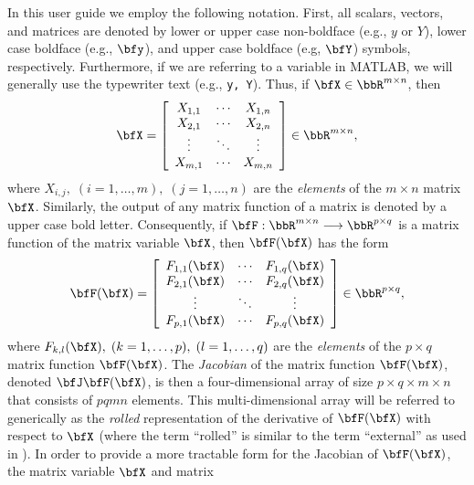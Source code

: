 \documentclass[10pt,pdftex]{article}
\begin{document}
In this user guide we employ the following notation.  First, all scalars, vectors, and matrices are denoted by lower or upper case non-boldface (e.g., $y$ or $Y$), lower case boldface (e.g., $\bfy$), and upper case boldface (e.g, $\bfY$) symbols, respectively. Furthermore, if we are referring to a variable in MATLAB, we will generally use the typewriter text (e.g., \texttt{y, Y}).
Thus, if $\bfX\in\bbR^{m\times n}$, then
\begin{equation}\label{general-matrix-x}
  \bfX =
  \left[\begin{array}{ccc}
      X_{1,1} & \cdots & X_{1,n} \\
      X_{2,1} & \cdots & X_{2,n} \\
      \vdots & \ddots & \vdots \\
      X_{m,1} & \cdots & X_{m,n}
    \end{array}
  \right]\in\bbR^{m\times n}, 
\end{equation}
where $X_{i,j},\;(i=1,\ldots,m),\;(j=1,\ldots,n)$ are the {\em elements} 
of the $m\times n$ matrix $\bfX$.  Similarly, the output of any
matrix function of a matrix is denoted by a upper case bold letter.  Consequently,
if $\bfF:\bbR^{m\times n}\longrightarrow \bbR^{p\times q}$ is a matrix
function of the matrix variable $\bfX$, then $\bfF(\bfX)$ has the form
\begin{equation}\label{general-matrix-f}
  \bfF(\bfX) =
  \left[
    \begin{array}{ccc}
      F_{1,1}(\bfX) & \cdots & F_{1,q}(\bfX) \\
      F_{2,1}(\bfX) & \cdots & F_{2,q}(\bfX) \\
      \vdots & \ddots & \vdots \\
      F_{p,1}(\bfX) & \cdots & F_{p,q}(\bfX)
    \end{array}
  \right]\in\bbR^{p\times q},
\end{equation}
where $F_{k,l}(\bfX),\;(k=1,\ldots,p),\;(l=1,\ldots,q)$ are the 
{\em elements} of the $p\times q$ matrix function $\bfF(\bfX)$.  
The {\em Jacobian} of the matrix function $\bfF(\bfX)$, denoted
$\bfJ\bfF(\bfX)$, is then a four-dimensional array of size $p\times
q\times m\times n$ that consists of $pqmn$ elements.  This
multi-dimensional array will be referred to generically as the 
{\em rolled} representation of the derivative of $\bfF(\bfX)$ with
respect to $\bfX$ (where the term ``rolled'' is similar to the term
``external'' as used in \cite{Forth1}).  In order to provide a more tractable form for
the Jacobian of $\bfF(\bfX)$, the matrix variable $\bfX$ and matrix
\end{document}
